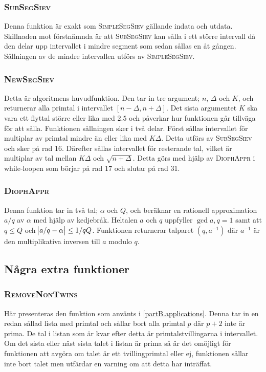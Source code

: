 \subsubsection*{\textsc{SubSegSiev}}
Denna funktion är exakt som \textsc{SimpleSegSiev} gällande indata och utdata. 
Skillnaden mot förstnämnda är att \textsc{SubSegSiev} kan sålla i ett större intervall då den delar upp intervallet i mindre segment som sedan sållas en åt gången. Sållningen av de mindre intervallen utförs av \textsc{SimpleSegSiev}.


\subsubsection*{\textsc{NewSegSiev}}
Detta är algoritmens huvudfunktion. Den tar in tre argument; $n$, $\Delta$ och $K$, och returnerar alla primtal i intervallet $[n-\Delta,n+\Delta]$. Det sista argumentet $K$ ska vara ett flyttal större eller lika med $2.5$ och påverkar hur funktionen går tillväga för att sålla. Funktionen sållningen sker i två delar. Först sållas intervallet för multiplar av primtal mindre än eller lika med $K\Delta$. Detta utförs av \textsc{SubSegSiev} och sker på rad 16. Därefter sållas intervallet för resterande tal, vilket är multiplar av tal mellan $K\Delta$ och $\sqrt{n+\Delta}$. Detta görs med hjälp av \textsc{DiophAppr} i while-loopen som börjar på rad 17 och slutar på rad 31.

\subsubsection*{\textsc{DiophAppr}}
Denna funktion tar in två tal; $\alpha$ och $Q$, och beräknar en rationell approximation $a/q$ av $\alpha$ med hjälp av kedjebråk.
Heltalen $a$ och $q$ uppfyller $\gcd{a,q}=1$ samt att $q\leq Q$ och $\abs{a/q-\alpha}\leq 1/qQ$.
Funktionen returnerar talparet $(q, a^{-1})$ där $a^{-1}$ är den multiplikativa inversen till $a$ modulo $q$.


\subsection{Några extra funktioner}
\subsubsection*{\textsc{RemoveNonTwins}}
Här presenteras den funktion som använts i \ref{partB.applications}.
Denna tar in en redan sållad lista med primtal och sållar bort alla primtal $p$ där $p+2$ inte är prima.
De tal i listan som är kvar efter detta är primtalstvillingarna i intervallet.
Om det sista eller näst sista talet i listan är prima så är det omöjligt för funktionen att avgöra om talet är ett tvillingprimtal eller ej, funktionen sållar inte bort talet men utfärdar en varning om att detta har inträffat.
\label{code.twins}

